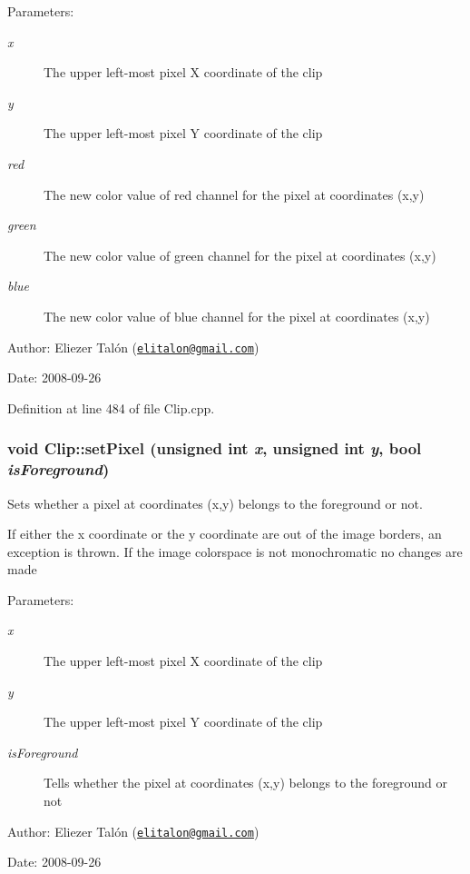 \begin{Desc}
\item[Parameters:]
\begin{description}
\item[{\em x}]The upper left-most pixel X coordinate of the clip \item[{\em y}]The upper left-most pixel Y coordinate of the clip \item[{\em red}]The new color value of red channel for the pixel at coordinates (x,y) \item[{\em green}]The new color value of green channel for the pixel at coordinates (x,y) \item[{\em blue}]The new color value of blue channel for the pixel at coordinates (x,y)\end{description}
\end{Desc}
\begin{Desc}
\item[Author:]Eliezer Talón (\href{mailto:elitalon@gmail.com}{\tt elitalon@gmail.com}) \end{Desc}
\begin{Desc}
\item[Date:]2008-09-26 \end{Desc}


Definition at line 484 of file Clip.cpp.\hypertarget{class_clip_9e78d68c58016aaff8c65ddac29ed07f}{
\subsubsection[setPixel]{\setlength{\rightskip}{0pt plus 5cm}void Clip::setPixel (unsigned int {\em x}, \/  unsigned int {\em y}, \/  bool {\em isForeground})}}
\label{class_clip_9e78d68c58016aaff8c65ddac29ed07f}


Sets whether a pixel at coordinates (x,y) belongs to the foreground or not. 

If either the x coordinate or the y coordinate are out of the image borders, an exception is thrown. If the image colorspace is not monochromatic no changes are made

\begin{Desc}
\item[Parameters:]
\begin{description}
\item[{\em x}]The upper left-most pixel X coordinate of the clip \item[{\em y}]The upper left-most pixel Y coordinate of the clip \item[{\em isForeground}]Tells whether the pixel at coordinates (x,y) belongs to the foreground or not\end{description}
\end{Desc}
\begin{Desc}
\item[Author:]Eliezer Talón (\href{mailto:elitalon@gmail.com}{\tt elitalon@gmail.com}) \end{Desc}
\begin{Desc}
\item[Date:]2008-09-26 \end{Desc}


